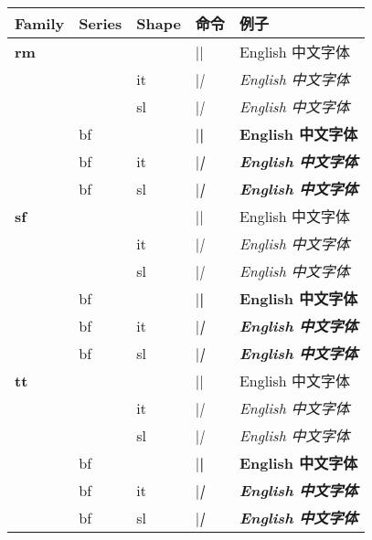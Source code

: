 \documentclass[cs4size,a4paper,fancyhdr,fntef,UTF8,winfonts]{ctexbook}
\begin{document}
\begin{center}
\begin{tabular}{lllll}

\hline
 Family & Series & Shape & 命令 & 例子 \\ \hline
 {\bf rm} &    &    & |\rmfamily| &
                      {\rmfamily English 中文字体} \\
          &    & it & |\rmfamily\itshape| &
                      {\rmfamily\itshape English 中文字体} \\
          &    & sl & |\rmfamily\slshape| &
                      {\rmfamily\slshape English 中文字体} \\ \cline{2-5}
          & bf &    & |\rmfamily\bfseries| &
                      {\rmfamily\bfseries English 中文字体} \\
          & bf & it & |\rmfamily\bfseries\itshape| &
                      {\rmfamily\bfseries\itshape English 中文字体} \\
          & bf & sl & |\rmfamily\bfseries\slshape| &
                      {\rmfamily\bfseries\slshape English 中文字体} \\ \hline

 {\bf sf} &    &    & |\sffamily| &
                      {\sffamily English 中文字体} \\
          &    & it & |\sffamily\itshape| &
                      {\sffamily\itshape English 中文字体} \\
          &    & sl & |\sffamily\slshape| &
                      {\sffamily\slshape English 中文字体} \\ \cline{2-5}
          & bf &    & |\sffamily\bfseries| &
                      {\sffamily\bfseries English 中文字体} \\
          & bf & it & |\sffamily\bfseries\itshape| &
                      {\sffamily\bfseries\itshape English 中文字体} \\
          & bf & sl & |\sffamily\bfseries\slshape| &
                      {\sffamily\bfseries\slshape English 中文字体} \\ \hline

 {\bf tt} &    &    & |\ttfamily| &
                      {\ttfamily English 中文字体} \\
          &    & it & |\ttfamily\itshape| &
                      {\ttfamily\itshape English 中文字体} \\
          &    & sl & |\ttfamily\slshape| &
                      {\ttfamily\slshape English 中文字体} \\ \cline{2-5}
          & bf &    & |\ttfamily\bfseries| &
                      {\ttfamily\bfseries English 中文字体} \\
          & bf & it & |\ttfamily\bfseries\itshape| &
                      {\ttfamily\bfseries\itshape English 中文字体} \\
          & bf & sl & |\ttfamily\bfseries\slshape| &
                      {\ttfamily\bfseries\slshape English 中文字体} \\ \hline
\end{tabular}
\end{center}
\end{document}
